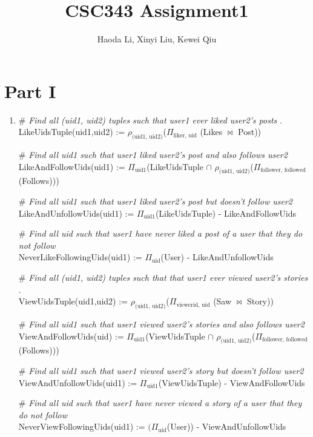 \documentclass[letter, 9pt]{article}
\title{CSC343 Assignment1}
\author{Haoda Li, Xinyi Liu, Kewei Qiu}
\begin{document}
\maketitle
\section*{Part I}
\begin{enumerate}
    \item {\color{gray} \# \textit{Find all (uid1, uid2) tuples such that user1 ever liked user2's posts} .\\}
    LikeUidsTuple(uid1,uid2) := $\rho_{\text{(uid1, uid2)}}$($\Pi_{\text{liker, uid} }$ (Likes $\bowtie$ Post)) 
   
    {\color{gray} \# \textit{Find all uid1 such that user1 liked user2's post and also follows user2}\\}
    LikeAndFollowUids(uid1) := $\Pi_{\text{uid1}}$(LikeUidsTuple $\cap$ $\rho_{\text{(uid1, uid2)}}$($\Pi_{\text{follower, followed}}$ (Follows))) 
    
    {\color{gray} \# \textit{Find all uid1 such that user1 liked user2's post but doesn't follow user2}\\}
    LikeAndUnfollowUids(uid1) := $\Pi_{\text{uid1}}$(LikeUidsTuple) - LikeAndFollowUids
    
    {\color{gray} \# \textit{Find all uid such that user1 have never liked a post of a user that they do not follow}\\}
    NeverLikeFollowingUids(uid1) := $\Pi_{\text{uid}}$(User) - LikeAndUnfollowUids 
    
    {\color{gray} \# \textit{Find all (uid1, uid2) tuples such that that user1 ever viewed user2's stories} .\\}
    ViewUidsTuple(uid1,uid2) := $\rho_{\text{(uid1, uid2)}}$($\Pi_{\text{viewerid, uid} }$ (Saw $\bowtie$ Story)) 
   
    {\color{gray} \# \textit{Find all uid1 such that user1 viewed user2's stories and also follows user2}\\}
    ViewAndFollowUids(uid) := $\Pi_{\text{uid1}}$(ViewUidsTuple $\cap$ $\rho_{\text{(uid1, uid2)}}$($\Pi_{\text{follower, followed}}$ (Follows))) 
    
    {\color{gray} \# \textit{Find all uid1 such that user1 viewed user2's story but doesn't follow user2}\\}
    ViewAndUnfollowUids(uid1) := $\Pi_{\text{uid1}}$(ViewUidsTuple) - ViewAndFollowUids
    
    {\color{gray} \# \textit{Find all uid such that user1 have never viewed a story of a user that they do not follow}\\}
    NeverViewFollowingUids(uid1) := $(\Pi_{\text{uid}}$(User)) - ViewAndUnfollowUids 
    

\end{enumerate}
\end{document}
